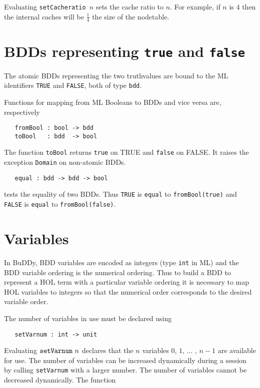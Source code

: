 \documentclass[12pt]{article}
\newcommand{\bnind}[1]{\index[MLbn]{#1}}
\renewcommand{\t}[1]{\mbox{\tt #1}}
\newcommand{\ml}[1]{{\tt #1}}
\newcommand\HOL{HOL\xspace}
\newcommand{\Buddy}{BuDDy\xspace}
\begin{document}
Evaluating \t{setCacheratio~$n$} sets the cache ratio to $n$.  
For example, if $n$ is $4$ then the internal caches will be $\frac{1}{4}$ the size of the
nodetable.



\section{BDDs representing {\t{true}} and {\t{false}}}

The atomic BDDs representing the two truthvalues are bound to the ML
identifiers \t{TRUE} and \t{FALSE}, both of type \t{bdd}.

Functions for mapping from ML Booleans to BDDs and vice versa are, respectively

\begin{verbatim}
   fromBool : bool -> bdd
   toBool   : bdd  -> bool
\end{verbatim}\bnind{\ml{fromBool}}\bnind{\ml{toBool}}

The function \t{toBool} returns \t{true} on TRUE and \t{false} on FALSE.
It raises the exception \t{Domain} on non-atomic BDDs.

\begin{verbatim}
   equal : bdd -> bdd -> bool
\end{verbatim}\bnind{\ml{equal}}

tests the equality of two BDDs. Thus \t{TRUE} is \t{equal} to \t{fromBool(true)} and 
\t{FALSE} is \t{equal} to \t{fromBool(false)}.

\section{Variables}

In \Buddy, BDD variables are encoded as integers (type \t{int} in ML) and the BDD variable ordering
is the numerical ordering. Thus to build a BDD to represent a \HOL{} term with a
particular variable ordering it is necessary to map \HOL{} variables to
integers so that the numerical order corresponds to the desired
variable order.

The number of variables in use must be declared using

\begin{verbatim}
   setVarnum : int -> unit
\end{verbatim}\bnind{\ml{setVarnum}}

Evaluating $\t{setVarnum}~n$ declares that the $n$ variables $0$,
$1$, $\ldots$ , $n{-}1$ are available for use. The number of variables
can be increased dynamically during a session by calling \t{setVarnum}
with a larger number. The number of variables cannot be decreased
dynamically. The function
\end{document}
